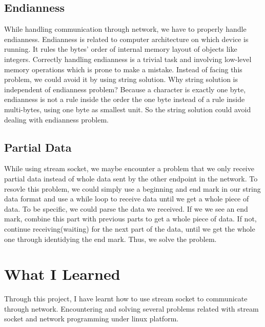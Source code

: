 \documentclass[a4paper]{report}
\begin{document}
\subsection*{Endianness}
While handling communication through network, we have to properly handle endianness. Endianness is related to computer architecture on which device is running. It rules the bytes' order of internal memory layout of objects like integers. Correctly handling endianness is a trivial task and involving low-level memory operations which is prone to make a mistake. Instead of facing this problem, we could avoid it by using string solution. Why string solution is independent of endianness problem? Because a character is exactly one byte, endianness is not a rule inside the order the one byte instead of a rule inside multi-bytes, using one byte as smallest unit. So the string solution could avoid dealing with endianness problem.

\subsection*{Partial Data}
While using stream socket, we maybe encounter a problem that we only receive partial data instead of whole data sent by the other endpoint in the network. To resovle this problem, we could simply use a beginning and end mark in our string data format and use a while loop to receive data until we get a whole piece of data. To be specific, we could parse the data we received. If we we see an end mark, combine this part with previous parts to get a whole piece of data. If not, continue receiving(waiting) for the next part of the data, until we get the whole one through identidying the end mark. Thus, we solve the problem.

\section*{What I Learned}
Through this project, I have learnt how to use stream socket to communicate through network. Encountering and solving several problems related with stream socket and network programming under linux platform.
\end{document}
